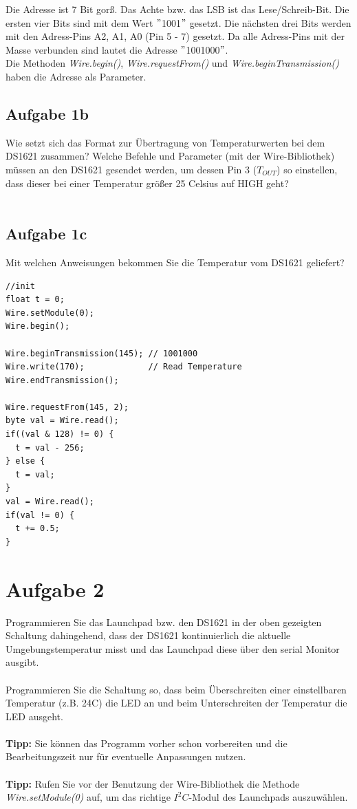 \noindent Die Adresse ist 7 Bit gor\ss{}. Das Achte bzw. das LSB ist das Lese/Schreib-Bit. Die ersten vier Bits sind mit dem Wert $"$1001$"$ gesetzt. Die nächsten drei Bits werden mit den Adress-Pins A2, A1, A0 (Pin 5 - 7) gesetzt. Da alle Adress-Pins mit der Masse verbunden sind lautet die Adresse $"$1001000$"$.\\
Die Methoden \textit{Wire.begin()}, \textit{Wire.requestFrom()} und \textit{Wire.beginTransmission()} haben die Adresse als Parameter.
\subsection{Aufgabe 1b}
Wie setzt sich das Format zur Übertragung von Temperaturwerten bei dem DS1621 zusammen? Welche Befehle und Parameter (mit der Wire-Bibliothek) müssen an den DS1621 gesendet werden, um dessen Pin 3 ($T_{OUT}$) so einstellen, dass dieser bei einer Temperatur grö\ss{}er 25\textdegree{} Celsius auf HIGH geht?\\ \\

\subsection{Aufgabe 1c}
Mit welchen Anweisungen bekommen Sie die Temperatur vom DS1621 geliefert?
\begin{lstlisting}
//init
float t = 0;
Wire.setModule(0);
Wire.begin();

Wire.beginTransmission(145); // 1001000
Wire.write(170);             // Read Temperature
Wire.endTransmission();

Wire.requestFrom(145, 2);
byte val = Wire.read();
if((val & 128) != 0) {
  t = val - 256;
} else {
  t = val;
}
val = Wire.read();
if(val != 0) {
  t += 0.5;
}
\end{lstlisting}
\section{Aufgabe 2}
Programmieren Sie das Launchpad bzw. den DS1621 in der oben gezeigten Schaltung dahingehend, dass der DS1621 kontinuierlich die aktuelle Umgebungstemperatur misst und das Launchpad diese über den serial Monitor ausgibt.\\ \\
Programmieren Sie die Schaltung so, dass beim Überschreiten einer einstellbaren Temperatur (z.B. 24\textdegree{}C) die LED an und beim Unterschreiten der Temperatur die LED ausgeht.\\ \\
\textbf{Tipp:} Sie können das Programm vorher schon vorbereiten und die Bearbeitungszeit nur für eventuelle Anpassungen nutzen.\\ \\
\textbf{Tipp:} Rufen Sie vor der Benutzung der Wire-Bibliothek die Methode\\
\textit{Wire.setModule(0)} auf, um das richtige $I^2C$-Modul des Launchpads auszuwählen.\\ \\
